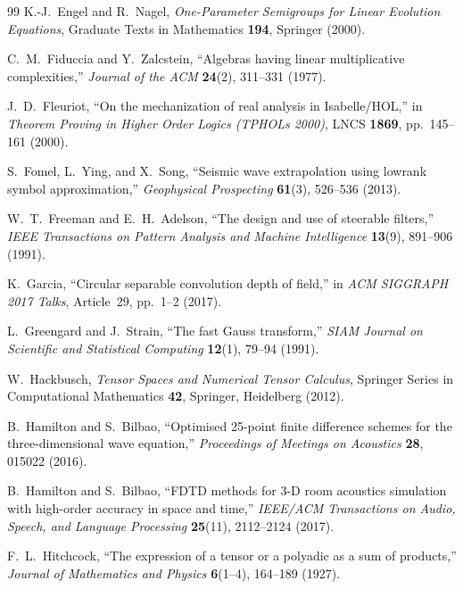 \documentclass[11pt,a4paper]{article}
\theoremstyle{plain}
\theoremstyle{definition}
\begin{document}
\begin{thebibliography}{99}
K.-J.~Engel and R.~Nagel,
\emph{One-Parameter Semigroups for Linear Evolution Equations},
Graduate Texts in Mathematics \textbf{194}, Springer (2000).

C.~M.~Fiduccia and Y.~Zalcstein,
``Algebras having linear multiplicative complexities,''
\emph{Journal of the ACM} \textbf{24}(2), 311--331 (1977).

J.~D.~Fleuriot,
``On the mechanization of real analysis in Isabelle/HOL,''
in \emph{Theorem Proving in Higher Order Logics (TPHOLs 2000)}, LNCS \textbf{1869}, pp.~145--161 (2000).

S.~Fomel, L.~Ying, and X.~Song,
``Seismic wave extrapolation using lowrank symbol approximation,''
\emph{Geophysical Prospecting} \textbf{61}(3), 526--536 (2013).

W.~T.~Freeman and E.~H.~Adelson,
``The design and use of steerable filters,''
\emph{IEEE Transactions on Pattern Analysis and Machine Intelligence} \textbf{13}(9), 891--906 (1991).

K.~Garcia,
``Circular separable convolution depth of field,''
in \emph{ACM SIGGRAPH 2017 Talks}, Article~29, pp.~1--2 (2017).

L.~Greengard and J.~Strain,
``The fast Gauss transform,''
\emph{SIAM Journal on Scientific and Statistical Computing} \textbf{12}(1), 79--94 (1991).

W.~Hackbusch,
\emph{Tensor Spaces and Numerical Tensor Calculus},
Springer Series in Computational Mathematics \textbf{42}, Springer, Heidelberg (2012).

B.~Hamilton and S.~Bilbao,
``Optimised 25-point finite difference schemes for the three-dimensional wave equation,''
\emph{Proceedings of Meetings on Acoustics} \textbf{28}, 015022 (2016).

B.~Hamilton and S.~Bilbao,
``FDTD methods for 3-D room acoustics simulation with high-order accuracy in space and time,''
\emph{IEEE/ACM Transactions on Audio, Speech, and Language Processing} \textbf{25}(11), 2112--2124 (2017).

F.~L.~Hitchcock,
``The expression of a tensor or a polyadic as a sum of products,''
\emph{Journal of Mathematics and Physics} \textbf{6}(1--4), 164--189 (1927).


\end{thebibliography}
\end{document}
